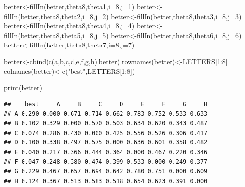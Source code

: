 \documentclass[
]{book}
\newenvironment{Shaded}{\begin{snugshade}}{\end{snugshade}}
\newcommand{\AttributeTok}[1]{\textcolor[rgb]{0.77,0.63,0.00}{#1}}
\newcommand{\DecValTok}[1]{\textcolor[rgb]{0.00,0.00,0.81}{#1}}
\newcommand{\FunctionTok}[1]{\textcolor[rgb]{0.00,0.00,0.00}{#1}}
\newcommand{\NormalTok}[1]{#1}
\newcommand{\OtherTok}[1]{\textcolor[rgb]{0.56,0.35,0.01}{#1}}
\newcommand{\SpecialCharTok}[1]{\textcolor[rgb]{0.00,0.00,0.00}{#1}}
\newcommand{\StringTok}[1]{\textcolor[rgb]{0.31,0.60,0.02}{#1}}
\theoremstyle{definition}
\theoremstyle{definition}
\theoremstyle{definition}
\theoremstyle{definition}
\theoremstyle{remark}
\begin{document}
\begin{Shaded}
\begin{Highlighting}[]
\NormalTok{   better}\OtherTok{\textless{}{-}}\FunctionTok{fillIn}\NormalTok{(better,theta8,theta1,}\AttributeTok{i=}\DecValTok{8}\NormalTok{,}\AttributeTok{j=}\DecValTok{1}\NormalTok{)}
\NormalTok{  better}\OtherTok{\textless{}{-}}\FunctionTok{fillIn}\NormalTok{(better,theta8,theta2,}\AttributeTok{i=}\DecValTok{8}\NormalTok{,}\AttributeTok{j=}\DecValTok{2}\NormalTok{)}
\NormalTok{  better}\OtherTok{\textless{}{-}}\FunctionTok{fillIn}\NormalTok{(better,theta8,theta3,}\AttributeTok{i=}\DecValTok{8}\NormalTok{,}\AttributeTok{j=}\DecValTok{3}\NormalTok{)}
\NormalTok{  better}\OtherTok{\textless{}{-}}\FunctionTok{fillIn}\NormalTok{(better,theta8,theta4,}\AttributeTok{i=}\DecValTok{8}\NormalTok{,}\AttributeTok{j=}\DecValTok{4}\NormalTok{)}
\NormalTok{  better}\OtherTok{\textless{}{-}}\FunctionTok{fillIn}\NormalTok{(better,theta8,theta5,}\AttributeTok{i=}\DecValTok{8}\NormalTok{,}\AttributeTok{j=}\DecValTok{5}\NormalTok{)}
\NormalTok{  better}\OtherTok{\textless{}{-}}\FunctionTok{fillIn}\NormalTok{(better,theta8,theta6,}\AttributeTok{i=}\DecValTok{8}\NormalTok{,}\AttributeTok{j=}\DecValTok{6}\NormalTok{)}
\NormalTok{  better}\OtherTok{\textless{}{-}}\FunctionTok{fillIn}\NormalTok{(better,theta8,theta7,}\AttributeTok{i=}\DecValTok{8}\NormalTok{,}\AttributeTok{j=}\DecValTok{7}\NormalTok{)}

\NormalTok{  better}\OtherTok{\textless{}{-}}\FunctionTok{cbind}\NormalTok{(}\FunctionTok{c}\NormalTok{(a,b,c,d,e,f,g,h),better)}
  \FunctionTok{rownames}\NormalTok{(better)}\OtherTok{\textless{}{-}}\NormalTok{LETTERS[}\DecValTok{1}\SpecialCharTok{:}\DecValTok{8}\NormalTok{]}
  \FunctionTok{colnames}\NormalTok{(better)}\OtherTok{\textless{}{-}}\FunctionTok{c}\NormalTok{(}\StringTok{"best"}\NormalTok{,LETTERS[}\DecValTok{1}\SpecialCharTok{:}\DecValTok{8}\NormalTok{])}
  
  \FunctionTok{print}\NormalTok{(better)}
\end{Highlighting}
\end{Shaded}

\begin{verbatim}
##    best     A     B     C     D     E     F     G     H
## A 0.290 0.000 0.671 0.714 0.662 0.783 0.752 0.533 0.633
## B 0.102 0.329 0.000 0.570 0.503 0.634 0.620 0.343 0.487
## C 0.074 0.286 0.430 0.000 0.425 0.556 0.526 0.306 0.417
## D 0.100 0.338 0.497 0.575 0.000 0.636 0.601 0.358 0.482
## E 0.040 0.217 0.366 0.444 0.364 0.000 0.467 0.220 0.346
## F 0.047 0.248 0.380 0.474 0.399 0.533 0.000 0.249 0.377
## G 0.229 0.467 0.657 0.694 0.642 0.780 0.751 0.000 0.609
## H 0.124 0.367 0.513 0.583 0.518 0.654 0.623 0.391 0.000
\end{verbatim}
\end{document}
